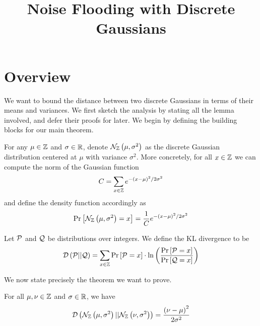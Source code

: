 \documentclass{article}
\title{Noise Flooding with Discrete Gaussians}
\author{}
\begin{document}
\maketitle

\section{Overview}

We want to bound the distance between two discrete Gaussians in terms of their means and variances.
We first sketch the analysis by stating all the lemma involved, and defer their proofs for later.
We begin by defining the building blocks for our main theorem.

\begin{definition}
	For any $\mu\in\mathbb{Z}$ and $\sigma\in\mathbb{R}$, denote $\mathcal{N}_{\mathbb{Z}}\left(\mu, \sigma^2\right)$ as the discrete Gaussian distribution centered at $\mu$ with variance $\sigma^2$.
	More concretely, for all $x\in\mathbb{Z}$ we can compute the norm of the Gaussian function
	\begin{equation}
		C=\sum_{x\in\mathbb{Z}} e^{-\left(x-\mu\right)^2/2\sigma^2}
	\end{equation}
	and define the density function accordingly as
	\begin{equation}
		\Pr\left[\mathcal{N}_{\mathbb{Z}}\left(\mu, \sigma^2\right)=x\right]=\frac{1}{C}e^{-\left(x-\mu\right)^2/2\sigma^2}
	\end{equation}
\end{definition}

\begin{definition}
	Let $\mathcal{P}$ and $\mathcal{Q}$ be distributions over integers.
	We define the KL divergence to be
	\begin{equation}
		\mathcal{D}\left(\mathcal{P} || \mathcal{Q}\right) = \sum_{x\in\mathbb{Z}}\Pr\left[\mathcal{P} = x\right]\cdot
		\ln\left(\frac{\Pr\left[\mathcal{P}=x\right]}{\Pr\left[\mathcal{Q}=x\right]}\right)
	\end{equation}
\end{definition}

We now state precisely the theorem we want to prove.

\begin{theorem}
	\label{theorem:noise-flooding}
	For all $\mu, \nu\in\mathbb{Z}$ and $\sigma\in\mathbb{R}$, we have
	\begin{equation}
		\mathcal{D}\left(\mathcal{N}_{\mathbb{Z}}\left(\mu, \sigma^2\right) || \mathcal{N}_{\mathbb{Z}}\left(\nu, \sigma^2\right)\right) = \frac{\left(\nu - \mu\right)^2}{2\sigma^2}
	\end{equation}
\end{theorem}
\end{document}
